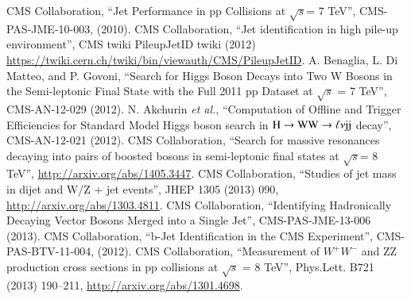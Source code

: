\begin{thebibliography}{99}
 CMS Collaboration, ``Jet Performance in pp Collisions at $\sqrt s$= 7 TeV'', CMS-PAS-JME-10-003, (2010).
  CMS Collaboration, ``Jet identification in high pile-up environment'', CMS twiki
PileupJetID twiki (2012) {\url {https://twiki.cern.ch/twiki/bin/viewauth/CMS/PileupJetID}}.
 A. Benaglia, L. Di Matteo, and P. Govoni, ``Search for Higgs Boson Decays into Two W
Bosons in the Semi-leptonic Final State with the Full 2011 pp Dataset at $\sqrt{s}$ = 7 TeV'', CMS-AN-12-029 (2012).
 N. Akchurin {\it et al.}, ``Computation of Offline and Trigger Efficiencies for Standard Model
Higgs boson search in $\rm H\rightarrow WW\rightarrow \ell\nu jj$ decay'', CMS-AN-12-021 (2012).
 CMS Collaboration, ``Search for massive resonances decaying into pairs of
boosted bosons in semi-leptonic final states at $\sqrt{s}$= 8 TeV'', \url{http://arxiv.org/abs/1405.3447}.
 {CMS Collaboration}, ``Studies of jet mass in dijet and W/Z + jet events'',
JHEP 1305 (2013) 090, \url{http://arxiv.org/abs/1303.4811}.
 {CMS Collaboration}, ``Identifying Hadronically Decaying Vector Bosons Merged into a
Single Jet'', CMS-PAS-JME-13-006 (2013).
 {CMS Collaboration}, ``b-Jet Identification in the CMS Experiment'', CMS-PAS-BTV-11-004, (2012).
 CMS Collaboration, “Measurement of $W^+W^-$ and ZZ production cross
sections in pp collisions at $\sqrt{s}$ = 8 TeV”, Phys.Lett. B721 (2013) 190–211, \url{http://arxiv.org/abs/1301.4698}.


\end{thebibliography}
